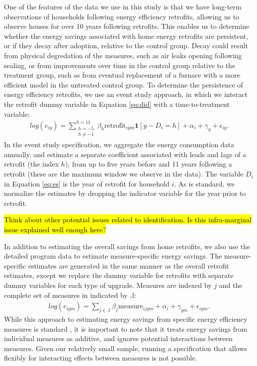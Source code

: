 \documentclass{article}
\newcommand{\hlc}[2][yellow]{ {\sethlcolor{#1} \hl{#2}} }
\begin{document}
One of the features of the data we use in this study is that we have long-term observations of households following energy efficiency retrofits, allowing us to observe houses for over 10 years following retrofits. This enables us to determine whether the energy savings associated with home energy retrofits are persistent, or if they decay after adoption, relative to the control group. Decay could result from physical degredation of the measures, such as air leaks opening following sealing, or from improvements over time in the control group relative to the treatment group, such as from eventual replacement of a furnace with a more efficient model in the untreated control group. To determine the persistence of energy efficiency retrofits, we use an event study approach, in which we interact the retrofit dummy variable in Equation \eqref{eq:did} with a time-to-treatment variable:
\begin{align}
	log(e_{iy}) = \sum\limits_{\substack{h=-5 \\ h\neq -1}}^{h=11}  \beta_h \text{retrofit}_{iym}\bm{1}[y - D_i = h] + \alpha_i + \gamma_{y} + \epsilon_{iy}.
	\label{eq:es}
\end{align}
In the event study specification, we aggregate the energy consumption data annually, and estimate a separate coefficient associated with leads and lags of a retrofit (the index $h$), from up to five years before and 11 years following a retrofit (these are the maximum window we observe in the data). The variable $D_i$ in Equation \eqref{eq:es} is the year of retrofit for household $i$. As is standard, we normalize the estimates by dropping the indicator variable for the year prior to retrofit.


\hlc{Think about other potential issues related to identification. Is this infra-marginal issue explained well enough here?}



In addition to estimating the overall savings from home retrofits, we also use the detailed program data to estimate measure-specific energy savings. The measure-specific estimates are generated in the same manner as the overall retrofit estimates, except we replace the dummy variable for retrofits with separate dummy variables for each type of upgrade. Measures are indexed by $j$ and the complete set of measures in indicated by $\mathbb{J}$:
\begin{align}
	log(e_{iym}) = \sum_{j \in \mathbb{J}} \beta_j \text{measure}_{ijym} + \alpha_i + \gamma_{ym} + \epsilon_{iym}.
	\label{eq:mbm}
\end{align}
While this approach to estimating energy savings from specific energy efficiency measures is standard \citep[e.g., ][]{chuang2022residential,liang2018energy}, it is important to note that it treats energy savings from individual measures as additive, and ignores potential interactions between measures. Given our relatively small sample, running a specification that allows flexibly for interacting effects between measures is not possible.
\end{document}
